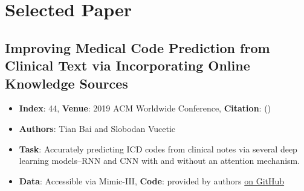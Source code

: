 \documentclass[
	letterpaper, %
]{jdf}
\newcommand{\pcite}[1]{(\cite{#1})}
\begin{document}
\topmargin=-0.45in
\evensidemargin=0in
\oddsidemargin=0in
\textwidth=6.5in
\textheight=9.0in
\headsep=0.25in

\linespread{1.1}

\section{Selected Paper}

\subsection{Improving Medical Code Prediction from Clinical Text via Incorporating Online Knowledge Sources}
\begin{itemize}[noitemsep,topsep=0pt,parsep=0pt,partopsep=0pt]
\item \textbf{Index}: 44, \textbf{Venue}: 2019 ACM Worldwide Conference, \textbf{Citation}: \pcite{improving_code_prediction}
\item \textbf{Authors}: Tian Bai and Slobodan Vucetic
\item \textbf{Task}: Accurately predicting ICD codes from clinical notes via several deep learning models–RNN and CNN with and without an attention mechanism.
\item \textbf{Data}: Accessible via Mimic-III, \textbf{Code}: provided by authors \href{https://github.com/tiantiantu/KSI}{on GitHub}
\end{itemize}


\printbibliography{}
\end{document}

